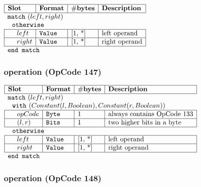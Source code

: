 \noindent
\(\begin{array}{| l | l | l | l |}
    \hline
    \bf{Slot} & \bf{Format} & \bf{\#bytes} & \bf{Description} \\
    \hline
        \multicolumn{4}{l}{\lst{match}~(left, right)} \\
         
    \multicolumn{4}{l}{~~\lst{otherwise} } \\
    \hline
            ~~~~ left & \lst{Value} & \text{[1, *]} & \text{left operand} \\
    \hline
          ~~~~ right & \lst{Value} & \text{[1, *]} & \text{right operand} \\
    \hline
          \multicolumn{4}{l}{\lst{end match}} \\
\end{array}\)
       

\subsubsection{ operation (OpCode 147)}

\noindent
\(\begin{array}{| l | l | l | l |}
    \hline
    \bf{Slot} & \bf{Format} & \bf{\#bytes} & \bf{Description} \\
    \hline
        \multicolumn{4}{l}{\lst{match}~(left, right)} \\
         
    \multicolumn{4}{l}{~~\lst{with}~(Constant(l, Boolean), Constant(r, Boolean)) } \\
    \hline
            ~~~~ opCode & \lst{Byte} & \text{1} & \text{always contains OpCode 133} \\
    \hline
          ~~~~ (l,r) & \lst{Bits} & \text{1} & \text{two higher bits in a byte} \\
    \hline
      
    \multicolumn{4}{l}{~~\lst{otherwise} } \\
    \hline
            ~~~~ left & \lst{Value} & \text{[1, *]} & \text{left operand} \\
    \hline
          ~~~~ right & \lst{Value} & \text{[1, *]} & \text{right operand} \\
    \hline
          \multicolumn{4}{l}{\lst{end match}} \\
\end{array}\)
       

\subsubsection{ operation (OpCode 148)}

